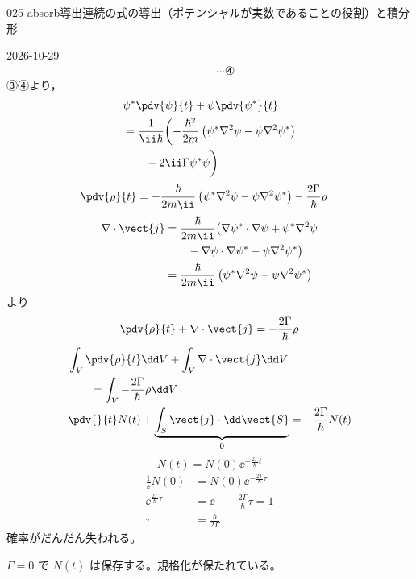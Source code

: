 \documentclass[uplatex,dvipdfmx,a4paper,11pt]{jsarticle}
\begin{document}
\begin{mondai}{025-absorb}{導出}{連続の式の導出（ポテンシャルが実数であることの役割）と積分形}
\begin{kotaeutsushi}{2026-10-29}
\begin{align*}
&\qquad\cdots\text{④}
\end{align*}
③\kakimachigai{$+$}{$-$}④より，
\begin{align*}
&\psi^{*}\pdv{\psi}{t}+\psi\pdv{\psi^{*}}{t}\\
&=\frac{1}{\ii\hbar}\biggl(-\frac{\hbar^{2}}{2m}\left(\psi^{*}\nabla^{2}\psi-\psi\nabla^{2}\psi^{*}\right)\\
&\qquad-2\ii\Gamma\psi^{*}\psi\biggr)
\end{align*}
\begin{align*}
\pdv{\rho}{t}&=-\frac{\hbar}{2m\ii}\left(\psi^{*}\nabla^{2}\psi-\psi\nabla^{2}\psi^{*}\right)-\frac{2\Gamma}{\hbar}\rho
\end{align*}
\begin{align*}
\nabla\cdot\vect{j}&=\frac{\hbar}{2m\ii}\bigl(\nabla\psi^{*}\cdot\nabla\psi+\psi^{*}\nabla^{2}\psi\\
&\qquad-\nabla\psi\cdot\nabla\psi^{*}-\psi\nabla^{2}\psi^{*}\bigr)\\
&=\frac{\hbar}{2m\ii}\left(\psi^{*}\nabla^{2}\psi-\psi\nabla^{2}\psi^{*}\right)
\end{align*}
より
\[ \pdv{\rho}{t}+\nabla\cdot\vect{j}=-\frac{2\Gamma}{\hbar}\rho \]
\begin{align*}
&\int_{V}\pdv{\rho}{t}\dd V+\int_{V}\nabla\cdot\vect{j}\dd V\\
&\qquad=\int_{V}-\frac{2\Gamma}{\hbar}\rho\dd V\\
&\pdv{}{t}N(t)+\underbrace{\int_{S}\vect{j}\cdot\dd\vect{S}}_{0}=-\frac{2\Gamma}{\hbar}N(t)
\end{align*}
\[ N(t)=N(0)\ee^{-\frac{2\Gamma}{\hbar}t} \]
\begin{align*}
\frac{1}{\ee}N(0)&=N(0)\ee^{-\frac{2\Gamma}{\hbar}\tau}\\
\ee^{\frac{2\Gamma}{\hbar}\tau}&=\ee\qquad\frac{2\Gamma}{\hbar}\tau=1\\
\tau&=\frac{\hbar}{2\Gamma}
\end{align*}
確率がだんだん失われる。

$\Gamma=0$ で $N(t)$ は保存する。規格化が保たれている。
\end{kotaeutsushi}
\end{mondai}
\end{document}

